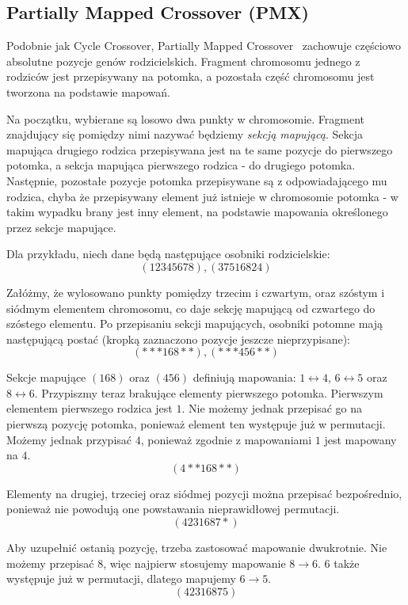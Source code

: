 \documentclass[brudnopis]{xmgr}
\begin{document}
\subsection{Partially Mapped Crossover (PMX)}

Podobnie jak Cycle Crossover, Partially Mapped Crossover~\cite{Larranaga99geneticalgorithms} zachowuje częściowo absolutne pozycje genów rodzicielskich. Fragment chromosomu jednego z rodziców jest przepisywany na potomka, a pozostała część chromosomu jest tworzona na podstawie mapowań.

Na początku, wybierane są losowo dwa punkty w chromosomie. Fragment znajdujący się pomiędzy nimi nazywać będziemy \emph{sekcją mapującą}. Sekcja mapująca drugiego rodzica przepisywana jest na te same pozycje do pierwszego potomka, a sekcja mapująca pierwszego rodzica - do drugiego potomka. Następnie, pozostałe pozycje potomka przepisywane są z odpowiadającego mu rodzica, chyba że przepisywany element już istnieje w chromosomie potomka - w takim wypadku brany jest inny element, na podstawie mapowania określonego przez sekcje mapujące.

Dla przykładu, niech dane będą następujące osobniki rodzicielskie:
$$ (1 2 3 4 5 6 7 8), (3 7 5 1 6 8 2 4) $$

Załóżmy, że wylosowano punkty pomiędzy trzecim i czwartym, oraz szóstym i siódmym elementem chromosomu, co daje sekcję mapującą od czwartego do szóstego elementu. Po przepisaniu sekcji mapujących, osobniki potomne mają następującą postać (kropką zaznaczono pozycje jeszcze nieprzypisane):
$$ (* * * 1 6 8 * *), (* * * 4 5 6 * *) $$

Sekcje mapujące $ (1 6 8) $ oraz $ (4 5 6) $ definiują mapowania: $ 1 \leftrightarrow 4 $, $ 6 \leftrightarrow 5 $ oraz $ 8 \leftrightarrow 6 $. Przypiszmy teraz brakujące elementy pierwszego potomka. Pierwszym elementem pierwszego rodzica jest $1$. Nie możemy jednak przepisać go na pierwszą pozycję potomka, ponieważ element ten występuje już w permutacji. Możemy jednak przypisać $4$, ponieważ zgodnie z mapowaniami $1$ jest mapowany na $4$.
$$ (4 * * 1 6 8 * *) $$

Elementy na drugiej, trzeciej oraz siódmej pozycji można przepisać bezpośrednio, ponieważ nie powodują one powstawania nieprawidłowej permutacji.
$$ (4 2 3 1 6 8 7 *) $$

Aby uzupełnić ostanią pozycję, trzeba zastosować mapowanie dwukrotnie. Nie możemy przepisać $8$, więc najpierw stosujemy mapowanie $8 \rightarrow 6$. $6$ także występuje już w permutacji, dlatego mapujemy $6 \rightarrow 5$.
$$ (4 2 3 1 6 8 7 5) $$
\end{document}
